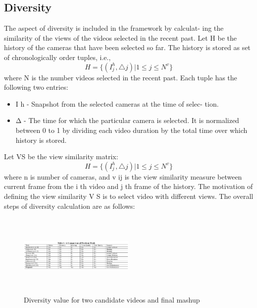 \documentclass{sig-alternate}
\begin{document}
\subsection{Diversity}
The aspect of diversity is included in the framework by calculat-
ing the similarity of the views of the videos selected in the recent
past. Let H be the history of the cameras that have been selected
so far. The history is stored as set of chronologically order tuples,
i.e.,
\begin{equation}
H = {\{}(I^h_j , \triangle j)|1 \leq j \leq N^v  {\}}
\end{equation}  
where N is the number videos selected in the recent past. Each
tuple has the following two entries:
\begin{itemize}
\item  I h - Snapshot from the selected cameras at the time of selec-
tion. 
\item  Δ - The time for which the particular camera is selected. It
is normalized between 0 to 1 by dividing each video duration
by the total time over which history is stored.
\end{itemize}
Let VS be the view similarity matrix:
\begin{equation}
H = {\{}(I^h_j , \triangle j)|1 \leq j \leq N^v  {\}}
\end{equation}  
where n is number of cameras, and v ij is the view similarity
measure between current frame from the i th video and j th frame
of the history. The motivation of defining the view similarity V S is
to select video with different views. The overall steps of diversity
calculation are as follows:
 \begin{figure}[h]
\includegraphics[width=0.5\textwidth ,height = 4cm]{2}
\caption{Diversity value for two candidate videos and ﬁnal mashup}
\label{fig:figure5}
\end{figure}
\end{document}
